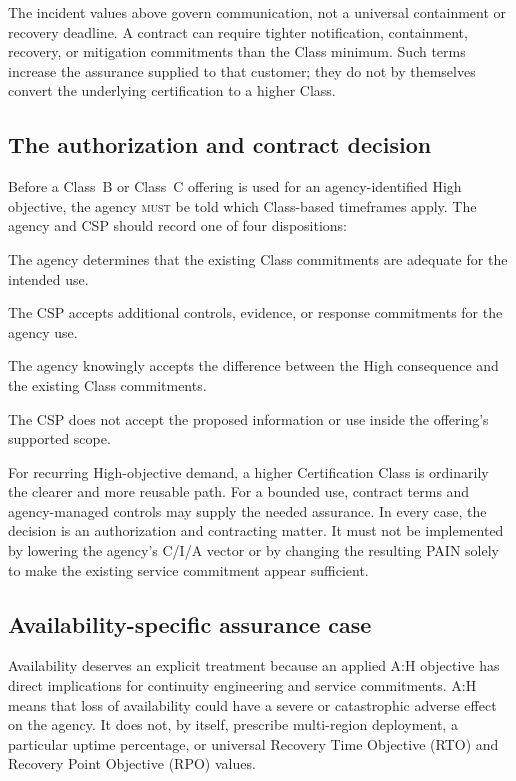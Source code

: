 \documentclass[11pt]{article}
\newcommand{\rfckw}[1]{\textsc{#1}}
\begin{document}
The incident values above govern communication, not a universal containment or
recovery deadline. A contract can require tighter notification, containment,
recovery, or mitigation commitments than the Class minimum. Such terms increase
the assurance supplied to that customer; they do not by themselves convert the
underlying certification to a higher Class.

\subsection{The authorization and contract decision}

Before a Class~B or Class~C offering is used for an agency-identified High
objective, the agency \rfckw{must} be told which Class-based timeframes apply. The
agency and CSP should record one of four dispositions:

\begin{description}[leftmargin=2.3em,style=nextline]
\item[Standard assurance fit] The agency determines that the existing Class
  commitments are adequate for the intended use.
\item[Contractually enhanced] The CSP accepts additional controls, evidence, or
  response commitments for the agency use.
\item[Accepted assurance divergence] The agency knowingly accepts the difference
  between the High consequence and the existing Class commitments.
\item[Unsupported intended use] The CSP does not accept the proposed information
  or use inside the offering's supported scope.
\end{description}

For recurring High-objective demand, a higher Certification Class is ordinarily
the clearer and more reusable path. For a bounded use, contract terms and
agency-managed controls may supply the needed assurance. In every case, the
decision is an authorization and contracting matter. It must not be implemented by
lowering the agency's C/I/A vector or by changing the resulting PAIN solely to make
the existing service commitment appear sufficient.

\subsection{Availability-specific assurance case}

Availability deserves an explicit treatment because an applied A:H objective has
direct implications for continuity engineering and service commitments. A:H means
that loss of availability could have a severe or catastrophic adverse effect on
the agency. It does not, by itself, prescribe multi-region deployment, a particular
uptime percentage, or universal Recovery Time Objective (RTO) and Recovery Point
Objective (RPO) values.
\end{document}
